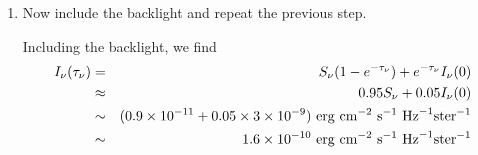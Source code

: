 \documentclass[11pt, preprint]{article}
\begin{document}
\begin{enumerate}
\item Now include the backlight and repeat the previous step.

  \begin{answer}
    Including the backlight, we find 
    \begin{eqnarray}
      I_\nu(\tau_\nu) &=& S_\nu(1-e^{-\tau_\nu}) + e^{-\tau_\nu}
      I_\nu(0) \cr
      &\approx& 0.95 S_\nu + 0.05 I_\nu(0) \cr
      &\sim &
        (0.9 \times 10^{-11} + 0.05\times 3\times 10^{-9})
         {\rm ~erg} {\rm ~cm}^{-2} {\rm ~s}^{-1}
           {\rm ~Hz}^{-1} {\rm ster}^{-1} \cr
      &\sim &
        1.6 \times 10^{-10}
         {\rm ~erg} {\rm ~cm}^{-2} {\rm ~s}^{-1}
           {\rm ~Hz}^{-1} {\rm ster}^{-1}
    \end{eqnarray}
  \end{answer}

\end{enumerate}
\end{document}
